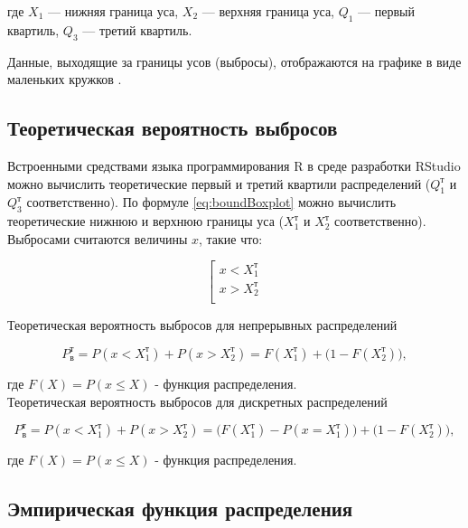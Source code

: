 \documentclass[a4paper,14pt]{article}
\begin{document}
	где $X_1$ --- нижняя граница уса, $X_2$ --- верхняя граница уса, $Q_1$ --- первый квартиль, $Q_3$ --- третий квартиль.
	
	Данные, выходящие за границы усов (выбросы), отображаются на графике в виде маленьких кружков \cite{s:boxplot}.
	
	\subsection{Теоретическая вероятность выбросов}
	
	Встроенными средствами языка программирования R в среде разработки RStudio можно вычислить теоретические первый и третий квартили распределений ($Q_1^\text{т}$ и $Q_3^\text{т}$ соответственно). По формуле \eqref{eq:boundBoxplot} можно вычислить теоретические нижнюю и верхнюю границы уса ($X_1^\text{т}$ и $X_2^\text{т}$ соответственно). Выбросами считаются величины $x$, такие что:
	
	\begin{equation}
		\left[ 
		\begin{gathered} 
			x < X_1^\text{т}\\ 
			x > X_2^\text{т}\\ 
		\end{gathered} 
		\right.
	\end{equation}
	
	Теоретическая вероятность выбросов для непрерывных распределений
	
	\begin{equation} \label{eq:probTheorCont}
		P_\text{в}^\text{т} = P(x < X_1^\text{т}) + P(x > X_2^\text{т}) = F(X_1^\text{т}) + \Big(1 - F(X_2^\text{т})\Big),
	\end{equation}
	
	где $F(X) = P(x \le X)$ - функция распределения.\\
	
	Теоретическая вероятность выбросов для дискретных распределений
	
	\begin{equation} \label{eq:probTheorDisc}
		P_\text{в}^\text{т} = P(x < X_1^\text{т}) + P(x > X_2^\text{т}) = \Big(F(X_1^\text{т}) - P(x = X_1^\text{т})\Big) + \Big(1 - F(X_2^\text{т})\Big),
	\end{equation}
	
	где $F(X) = P(x \le X)$ - функция распределения.
	
	\subsection{Эмпирическая функция распределения}
	
\end{document}
